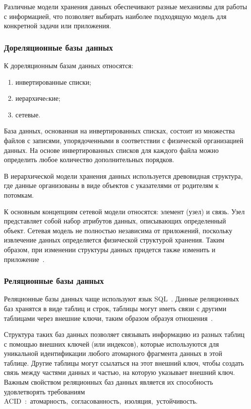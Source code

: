 Различные модели хранения данных обеспечивают разные механизмы для работы с информацией, что позволяет выбирать наиболее подходящую модель для конкретной задачи или приложения.

\subsubsection{Дореляционные базы данных}
К дореляционным базам данных относятся:
\begin{enumerate}[label*=---]
	\item инвертированные списки;
	\item иерархичеcкие;
	\item сетевые.
\end{enumerate}

База данных, основанная на инвертированных списках, состоит из множества файлов с записями, упорядоченными в соответствии с физической организацией данных. На основе инвертированных списков для каждого файла можно определить любое количество дополнительных порядков.

В иерархической модели хранения данных используется древовидная структура, где данные организованы в виде объектов с указателями от родителям к потомкам.

К основным концепциям сетевой модели относятся: элемент (узел) и связь. Узел представляет собой набор атрибутов данных, описывающих определенный объект. Сетевая модель не полностью независима от приложений, поскольку извлечение данных определяется физической структурой хранения. Таким образом, при изменении структуры данных придется также изменить и приложение~\cite{Begg}.

\subsubsection{Реляционные базы данных}

Реляционные базы данных чаще используют язык SQL~\cite{oracle}. Данные реляционных баз хранятся в виде таблиц и строк, таблицы могут иметь связи с другими таблицами через внешние ключи, таким образом образуя отношения~\cite{sql}. 

Структура таких баз данных позволяет связывать информацию из разных таблиц с помощью внешних ключей (или индексов), которые используются для уникальной идентификации любого атомарного фрагмента данных в этой таблице. Другие таблицы могут ссылаться на этот внешний ключ, чтобы создать связь между частями данных и частью, на которую указывает внешний ключ. Важным свойством реляционных баз данных является их способность удовлетворять требованиям ACID~\cite{acid}:~атомарность,~согласованность,~изоляция,~устойчивость.

